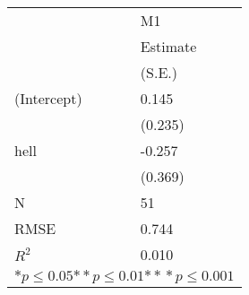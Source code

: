 \begin{tabular}{*{2}{l}}
\hline
                  & M1   \tabularnewline
                   &Estimate \tabularnewline
                 &(S.E.) \tabularnewline
 \hline
 \hline
   (Intercept)     &0.145 \tabularnewline
                 &(0.235)  \tabularnewline
   hell            &-0.257 \tabularnewline
                 &(0.369)  \tabularnewline
 \hline
 N                 &51       \tabularnewline
 RMSE             &0.744   \tabularnewline
 $R^2$             &0.010   \tabularnewline
 \hline
\hline
 
 \multicolumn{2}{c}{${*  p}\le 0.05$${*\!\!*  p}\le 0.01$${*\!\!*\!\!*  p}\le 0.001$}\tabularnewline
 \end{tabular}